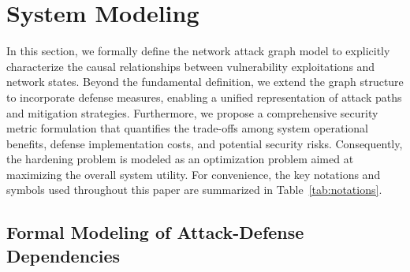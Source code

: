 \documentclass[conference]{IEEEtran}
\theoremstyle{definition} %
\theoremstyle{plain} %
\begin{document}
\section{System Modeling}
\label{sec:system_modeling}

In this section, we formally define the network attack graph model to explicitly characterize the causal relationships between vulnerability exploitations and network states. Beyond the fundamental definition, we extend the graph structure to incorporate defense measures, enabling a unified representation of attack paths and mitigation strategies. Furthermore, we propose a comprehensive security metric formulation that quantifies the trade-offs among system operational benefits, defense implementation costs, and potential security risks. Consequently, the hardening problem is modeled as an optimization problem aimed at maximizing the overall system utility. For convenience, the key notations and symbols used throughout this paper are summarized in Table~\ref{tab:notations}.

\subsection{Formal Modeling of Attack-Defense Dependencies}
\label{subsec:adg_modeling}
\end{document}
